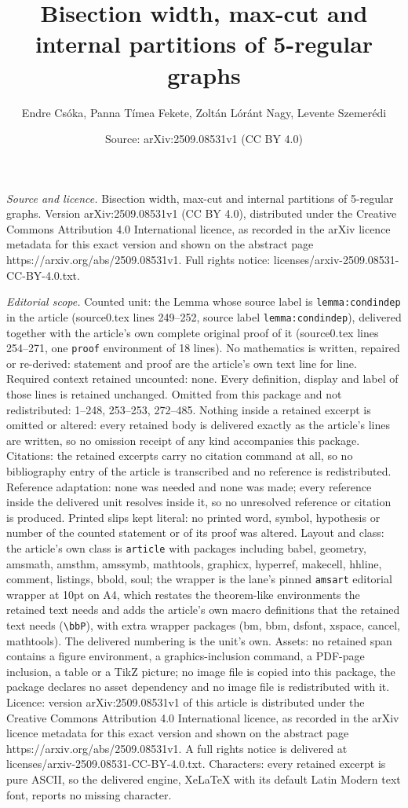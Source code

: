 \documentclass[10pt,a4paper]{amsart}
\title[Bisection width, max-cut and internal partitions of 5-regula]{Bisection width, max-cut and internal partitions of 5-regular graphs}
\author{Endre Cs\'oka, Panna T\'imea Fekete, Zolt\'an L\'or\'ant Nagy, Levente Szemer\'edi}
\date{Source: arXiv:2509.08531v1 (CC BY 4.0)}
\begin{document}
\maketitle

\noindent\emph{Source and licence.} Bisection width, max-cut and internal partitions of 5-regular graphs. Version arXiv:2509.08531v1 (CC BY 4.0), distributed under the Creative Commons Attribution 4.0 International licence, as recorded in the arXiv licence metadata for this exact version and shown on the abstract page https://arxiv.org/abs/2509.08531v1. Full rights notice: licenses/arxiv-2509.08531-CC-BY-4.0.txt.\par\smallskip

\noindent\textit{Editorial scope.} Counted unit: the Lemma whose source label is \texttt{lemma:condindep} in the article (source0.tex lines 249--252, source label \texttt{lemma:condindep}), delivered together with the article's own complete original proof of it (source0.tex lines 254--271, one \texttt{proof} environment of 18 lines). No mathematics is written, repaired or re-derived: statement and proof are the article's own text line for line. Required context retained uncounted: none. Every definition, display and label of those lines is retained unchanged. Omitted from this package and not redistributed: 1--248, 253--253, 272--485. Nothing inside a retained excerpt is omitted or altered: every retained body is delivered exactly as the article's lines are written, so no omission receipt of any kind accompanies this package. Citations: the retained excerpts carry no citation command at all, so no bibliography entry of the article is transcribed and no reference is redistributed. Reference adaptation: none was needed and none was made; every reference inside the delivered unit resolves inside it, so no unresolved reference or citation is produced. Printed slips kept literal: no printed word, symbol, hypothesis or number of the counted statement or of its proof was altered. Layout and class: the article's own class is \texttt{article} with packages including babel, geometry, amsmath, amsthm, amssymb, mathtools, graphicx, hyperref, makecell, hhline, comment, listings, bbold, soul; the wrapper is the lane's pinned \texttt{amsart} editorial wrapper at 10pt on A4, which restates the theorem-like environments the retained text needs and adds the article's own macro definitions that the retained text needs (\texttt{\textbackslash bbP}), with extra wrapper packages (bm, bbm, dsfont, xspace, cancel, mathtools). The delivered numbering is the unit's own. Assets: no retained span contains a figure environment, a graphics-inclusion command, a PDF-page inclusion, a table or a TikZ picture; no image file is copied into this package, the package declares no asset dependency and no image file is redistributed with it. Licence: version arXiv:2509.08531v1 of this article is distributed under the Creative Commons Attribution 4.0 International licence, as recorded in the arXiv licence metadata for this exact version and shown on the abstract page https://arxiv.org/abs/2509.08531v1. A full rights notice is delivered at licenses/arxiv-2509.08531-CC-BY-4.0.txt. Characters: every retained excerpt is pure ASCII, so the delivered engine, XeLaTeX with its default Latin Modern text font, reports no missing character.
\end{document}
